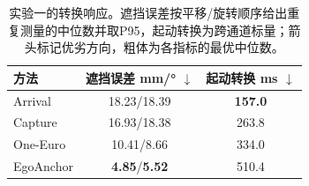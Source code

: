 \begin{table}[t]
\centering
\caption{实验一的转换响应。遮挡误差按平移/旋转顺序给出重复测量的中位数并取P95，起动转换为跨通道标量；箭头标记优劣方向，粗体为各指标的最优中位数。}
\label{tab:exp1-transition}
\setlength{\tabcolsep}{4.0pt}
\renewcommand{\arraystretch}{1.10}
\begin{tabular}{@{}lcc@{}}
\toprule
方法 &
\shortstack{遮挡误差\\mm/° $\downarrow$} &
\shortstack{起动转换\\ms $\downarrow$} \\
\midrule
Arrival   & 18.23/18.39 & \textbf{157.0} \\
Capture   & 16.93/18.38 & 263.8 \\
One-Euro  & 10.41/8.66 & 334.0 \\
EgoAnchor & \textbf{4.85}/\textbf{5.52} & 510.4 \\
\bottomrule
\end{tabular}
\end{table}
